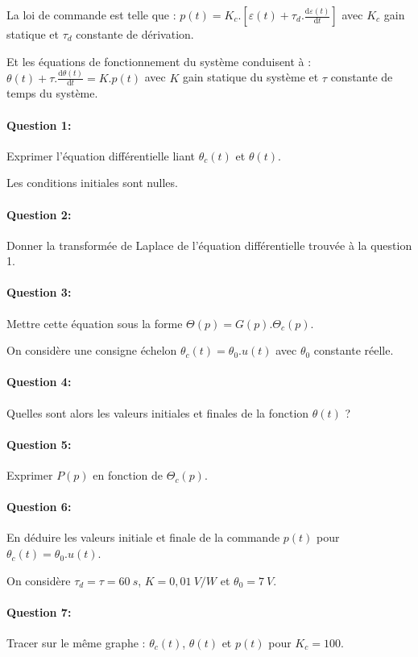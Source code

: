 La loi de commande est telle que : 
$p(t)=K_c.[\varepsilon(t)+\tau_d.\frac{\mathrm{d}\varepsilon(t)}{\mathrm{d}t}]$ avec $K_c$ gain statique et $\tau_d$ constante de dérivation.

Et les équations de fonctionnement du système conduisent à :
$\theta(t)+\tau.\frac{\mathrm{d}\theta(t)}{\mathrm{d}t}=K.p(t)$
avec $K$ gain statique du système et $\tau$ constante de temps du système.

\paragraph{Question 1:} Exprimer l'équation différentielle liant $\theta_c(t)$ et $\theta(t)$.

Les conditions initiales sont nulles.

\paragraph{Question 2:} Donner la transformée de Laplace de l'équation différentielle trouvée à la question 1.

\paragraph{Question 3:} Mettre cette équation sous la forme $\Theta(p)=G(p).\Theta_c(p)$.

On considère une consigne échelon $\theta_c(t)=\theta_0.u(t)$ avec $\theta_0$ constante réelle. 

\paragraph{Question 4:} Quelles sont alors les valeurs initiales et finales de la fonction $\theta(t)$ ?

\paragraph{Question 5:} Exprimer $P(p)$ en fonction de $\Theta_c(p)$.

\paragraph{Question 6:} En déduire les valeurs initiale et finale de la commande $p(t)$ pour $\theta_c(t)=\theta_0.u(t)$.

On considère $\tau_d=\tau=60\ s$, $K=0,01\ V/W$ et $\theta_0=7\ V$.

\paragraph{Question 7:} Tracer sur le même graphe : $\theta_c(t)$, $\theta(t)$ et $p(t)$ pour $K_c=100$.

